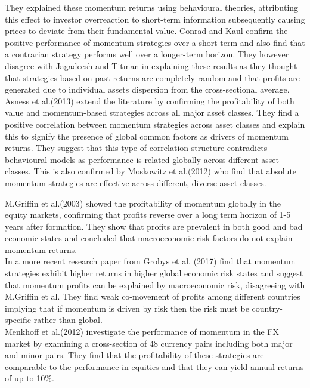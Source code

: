 \documentclass{article}
\begin{document}
They explained these momentum returns using behavioural theories, attributing this effect to investor overreaction to short-term information subsequently causing prices to deviate from their fundamental value. Conrad and Kaul confirm the positive performance of momentum strategies over a short term and also find that a contrarian strategy performs well over a longer-term horizon. They however disagree with Jagadeesh and Titman in explaining these results as they thought that strategies based on past returns are completely random and that profits are generated due to individual assets dispersion from the cross-sectional average.\\

Asness et al.(2013) extend the literature by confirming the profitability of both value and momentum-based strategies across all major asset classes. They find a positive correlation between momentum strategies across asset classes and explain this to signify the presence of global common factors as drivers of momentum returns. They suggest that this type of correlation structure contradicts behavioural models as performance is related globally across different asset classes. This is also confirmed by Moskowitz et al.(2012) who find that absolute momentum strategies are effective across different, diverse asset classes.

M.Griffin et al.(2003) showed the profitability of momentum globally in the equity markets, confirming that profits reverse over a long term horizon of 1-5 years after formation. They show that profits are prevalent in both good and bad economic states and concluded that macroeconomic risk factors do not explain momentum returns.\\

In a more recent research paper from Grobys et al. (2017) find that momentum strategies exhibit higher returns in higher global economic risk states and suggest that momentum profits can be explained by macroeconomic risk, disagreeing with M.Griffin et al. They find weak co-movement of profits among different countries implying that if momentum is driven by risk then the risk must be country-specific rather than global.\\

Menkhoff et al.(2012) investigate the performance of momentum in the FX market by examining a cross-section of 48 currency pairs including both major and minor pairs. They find that the profitability of these strategies are comparable to the performance in equities and that they can yield annual returns of up to 10\%. \\
\end{document}
